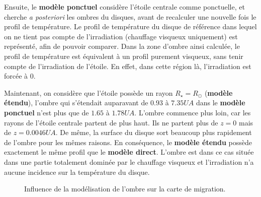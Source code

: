 Ensuite, le \textbf{modèle ponctuel} considère l'étoile centrale comme ponctuelle, et cherche \textit{a posteriori} les ombres du disques, avant de recalculer une nouvelle fois le profil de température. Le profil de température du disque de référence dans lequel on ne tient pas compte de l'irradiation (chauffage visqueux uniquement) est représenté, afin de pouvoir comparer. Dans la zone d'ombre ainsi calculée, le profil de température est équivalent à un profil purement visqueux, sans tenir compte de l'irradiation de l'étoile. En effet, dans cette région là, l'irradiation est forcée à 0. 

Maintenant, on considère que l'étoile possède un rayon $R_\star=R_\odot$ (\textbf{modèle étendu}), l'ombre qui s'étendait auparavant de $0.93$ à $7.35\unit{UA}$ dans le \textbf{modèle ponctuel} n'est plus que de $1.65$ à $1.78\unit{UA}$. L'ombre commence plus loin, car les rayons de l'étoile centrale partent de plus haut. Ils ne partent plus de $z=0$ mais de $z=0.0046\unit{UA}$. De même, la surface du disque sort beaucoup plus rapidement de l'ombre pour les mêmes raisons. En conséquence, le \textbf{modèle étendu} possède exactement le même profil que le \textbf{modèle direct}. L'ombre est dans ce cas située dans une partie totalement dominée par le chauffage visqueux et l'irradiation n'a aucune incidence sur la température du disque. 

\begin{figure}[htbp]
\centering
{}\hfill
{}

\caption[Influence de l'ombre sur la carte de migration.]{Influence de la modélisation de l'ombre sur la carte de migration. 
}\label{fig:map_shadow_effect}
\end{figure}

